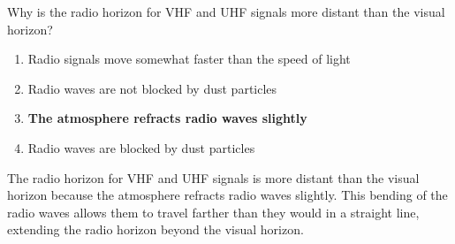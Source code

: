 \begin{tcolorbox}[colback=gray!10!white,colframe=black!75!black,title={T3C11}]
    Why is the radio horizon for VHF and UHF signals more distant than the visual horizon?
    \begin{enumerate}[label=\Alph*),noitemsep]
        \item Radio signals move somewhat faster than the speed of light
        \item Radio waves are not blocked by dust particles
        \item \textbf{The atmosphere refracts radio waves slightly}
        \item Radio waves are blocked by dust particles
    \end{enumerate}
\end{tcolorbox}
The radio horizon for VHF and UHF signals is more distant than the visual horizon because the atmosphere refracts radio waves slightly. This bending of the radio waves allows them to travel farther than they would in a straight line, extending the radio horizon beyond the visual horizon.
